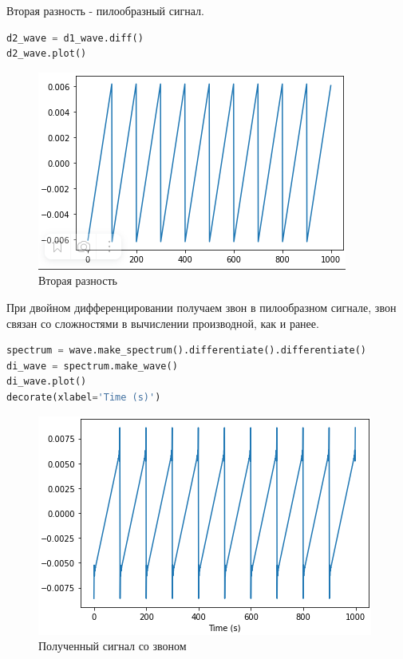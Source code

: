 Вторая разность - пилообразный сигнал.

\begin{lstlisting}[language=Python]
d2_wave = d1_wave.diff()
d2_wave.plot()
\end{lstlisting}
\begin{figure}[H]
	\begin{center}
		\includegraphics[scale=1]{fig/lab09/lab9_14.png}
		\caption{Вторая разность}
	\end{center}
\end{figure}

При двойном дифференцировании получаем звон в пилообразном сигнале, звон связан со сложностями в вычислении производной, как и ранее.

\begin{lstlisting}[language=Python]
spectrum = wave.make_spectrum().differentiate().differentiate()
di_wave = spectrum.make_wave()
di_wave.plot()
decorate(xlabel='Time (s)')
\end{lstlisting}
\begin{figure}[H]
	\begin{center}
		\includegraphics[scale=1]{fig/lab09/lab9_15.png}
		\caption{Полученный сигнал со звоном}
	\end{center}
\end{figure}

